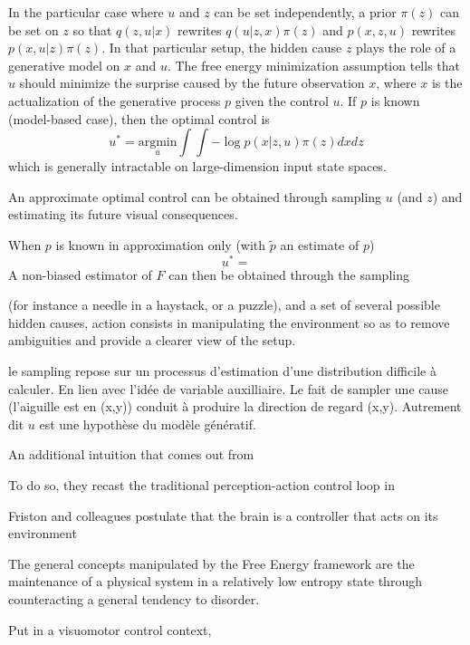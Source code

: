 \documentclass[12pt,twoside,openright]{article}
\begin{document}
{	In the particular case where $u$ and $z$ can be set independently, a prior $\pi(z)$ can be set on $z$ so that $q(z,u|x)$ rewrites $q(u|z,x)\pi(z)$ and $p(x, z, u)$ rewrites $p(x, u |z) \pi(z)$. In that particular setup, the hidden cause $z$ plays the role of a generative model on $x$ and $u$. The free energy minimization assumption tells that $u$ should minimize the surprise caused by the future observation $x$, where $x$ is the actualization of the generative process $p$ given the control $u$. 
	If $p$ is known (model-based case), then the optimal control is
	$$u^* = \underset{u}{\text{argmin}} \int \int - \log p(x|z, u) \pi(z) dx dz$$
	which is generally intractable on large-dimension input state spaces.
	
	An approximate optimal control can be obtained through sampling $u$ (and $z$) and estimating its future visual consequences.
	
	When $p$ is known in approximation only (with $\tilde{p}$ an estimate of $p$)
		$$u^* = $$ A non-biased estimator of $F$ can then be obtained through the sampling }
		

	
	(for instance a needle in a haystack, or a puzzle),  and a set of several possible hidden causes, action consists in manipulating the environment so as to remove ambiguities and provide a clearer view of the setup. 
	
	{\color{blue} le sampling repose sur un processus d'estimation d'une distribution difficile à calculer. En lien avec l'idée de variable auxilliaire. Le fait de sampler une cause (l'aiguille est en (x,y)) conduit à produire la direction de regard (x,y). Autrement dit $u$ est une hypothèse du modèle génératif. }
	
	
	
	{\color{blue}
		
		
		An additional intuition that comes out from
		
		To do so, they recast the traditional perception-action control loop in  		 
	
		
		
		Friston and colleagues postulate that the brain is a controller that acts on its environment 
		
		The general concepts manipulated by the Free Energy framework are the maintenance of a physical system in a relatively low entropy state through counteracting a general tendency to disorder. 
		
		Put in a visuomotor control context, 
		
	}
	
\end{document}
